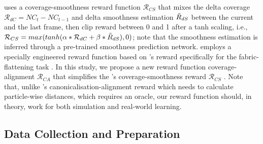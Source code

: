 \documentclass[journal]{IEEEtran}
\begin{document}
 \cite{avigal2022speedfolding} uses a coverage-smoothness reward function $\mathcal{R}_{CS}$ that mixes the delta coverage $\mathcal{R}_{dC} = NC_t - NC_{t-1}$ and delta smoothness estimation $\Tilde{R}_{dS}$ between the current and the last frame, then clip reward between 0 and 1 after a tanh scaling, i.e., $\mathcal{R}_{CS} = max(tanh(\alpha*\mathcal{R}_{dC} + \beta*\Tilde{R}_{dS}), 0)$; note that the smoothness estimation is inferred through a pre-trained smoothness prediction network.  employs a specially engineered reward function based on 's reward specifically for the fabric-flattening task \cite{hoque2022visuospatial}. In this study, we propose a new reward function coverage-alignment $\mathcal{R}_{CA}$ that simplifies the 's coverage-smoothness reward $\mathcal{R}_{CS}$ \cite{avigal2022speedfolding}. Note that, unlike 's canonicalisation-alignment reward which needs to calculate particle-wise distances, which requires an oracle, our reward function should, in theory, work for both simulation and real-world learning.



\subsection{Data Collection and Preparation}
\end{document}
